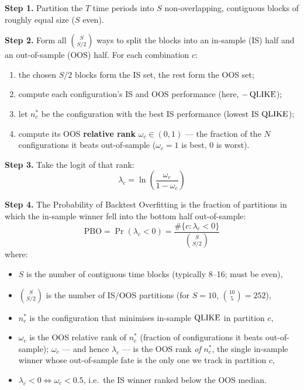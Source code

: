 \begin{definition}
\textbf{Step 1.} Partition the $T$ time periods into $S$ non-overlapping, contiguous blocks of roughly equal size ($S$ even).

\textbf{Step 2.} Form all $\binom{S}{S/2}$ ways to split the blocks into an in-sample (IS) half and an out-of-sample (OOS) half. For each combination $c$:
\begin{enumerate}[nosep]
  \item the chosen $S/2$ blocks form the IS set, the rest form the OOS set;
  \item compute each configuration's IS and OOS performance (here, $-\operatorname{QLIKE}$);
  \item let $n^*_c$ be the configuration with the best IS performance (lowest IS $\operatorname{QLIKE}$);
  \item compute its OOS \textbf{relative rank} $\omega_c \in (0,1)$ --- the fraction of the $N$ configurations it beats out-of-sample ($\omega_c = 1$ is best, $0$ is worst).
\end{enumerate}

\textbf{Step 3.} Take the logit of that rank:
\begin{equation}
\label{eq:ch16-pbo-logit}
\lambda_c = \ln\!\left(\frac{\omega_c}{1 - \omega_c}\right)
\end{equation}

\textbf{Step 4.} The Probability of Backtest Overfitting is the fraction of partitions in which the in-sample winner fell into the bottom half out-of-sample:
\begin{equation}
\label{eq:ch16-pbo}
\text{PBO} = \Pr(\lambda_c < 0) = \frac{\#\{c : \lambda_c < 0\}}{\binom{S}{S/2}}
\end{equation}
where:
\begin{itemize}[nosep]
  \item $S$ is the number of contiguous time blocks (typically 8--16; must be even),
  \item $\binom{S}{S/2}$ is the number of IS/OOS partitions (for $S=10$, $\binom{10}{5}=252$),
  \item $n^*_c$ is the configuration that minimises in-sample $\operatorname{QLIKE}$ in partition $c$,
  \item $\omega_c$ is the OOS relative rank of $n^*_c$ (fraction of configurations it beats out-of-sample); $\omega_c$ --- and hence $\lambda_c$ --- is the OOS rank \emph{of} $n^*_c$, the single in-sample winner whose out-of-sample fate is the only one we track in partition $c$,
  \item $\lambda_c < 0 \iff \omega_c < 0.5$, i.e.\ the IS winner ranked below the OOS median.
\end{itemize}
\end{definition}


